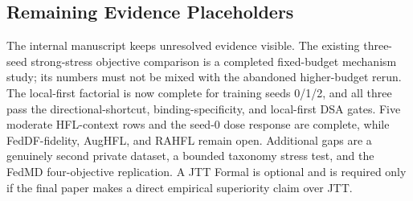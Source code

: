 \subsection{Remaining Evidence Placeholders}

The internal manuscript keeps unresolved evidence visible. The existing three-seed strong-stress objective comparison is a completed fixed-budget mechanism study; its numbers must not be mixed with the abandoned higher-budget rerun. The local-first factorial is now complete for training seeds 0/1/2, and all three pass the directional-shortcut, binding-specificity, and local-first DSA gates. Five moderate HFL-context rows and the seed-0 dose response are complete, while FedDF-fidelity, AugHFL, and RAHFL remain open. Additional gaps are a genuinely second private dataset, a bounded taxonomy stress test, and the FedMD four-objective replication. A JTT Formal is optional and is required only if the final paper makes a direct empirical superiority claim over JTT.


